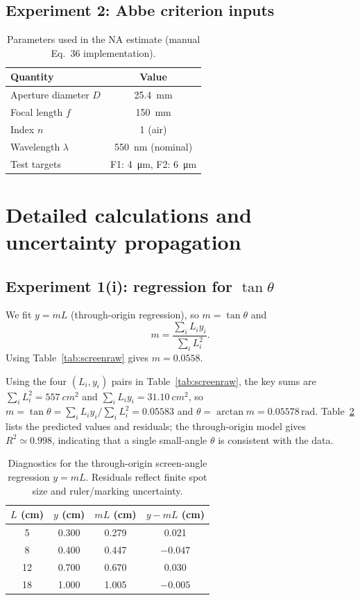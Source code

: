 \documentclass[10pt,twocolumn]{article}
\begin{document}
\subsection{Experiment 2: Abbe criterion inputs}
\begin{table}[H]
\centering
\caption{Parameters used in the NA estimate (manual Eq.~36 implementation).}
\label{tab:abbeinputs}
\begin{tabular}{@{}lc@{}}
\toprule
Quantity & Value \\ \midrule
Aperture diameter $D$ & \SI{25.4}{\milli\meter} \\
Focal length $f$ & \SI{150}{\milli\meter} \\
Index $n$ & 1 (air) \\
Wavelength $\lambda$ & \SI{550}{\nano\meter} (nominal) \\
Test targets & F1: \SI{4}{\micro\meter}, F2: \SI{6}{\micro\meter} \\ \bottomrule
\end{tabular}
\end{table}

\section{Detailed calculations and uncertainty propagation}
\label{app:calc}
\subsection{Experiment 1(i): regression for $\tan\theta$}
We fit $y=mL$ (through-origin regression), so $m=\tan\theta$ and
\begin{equation}
 m = \frac{\sum_i L_i y_i}{\sum_i L_i^2}.
\end{equation}
Using Table~\ref{tab:screenraw} gives $m=0.0558$.

Using the four $(L_i,y_i)$ pairs in Table~\ref{tab:screenraw}, the key sums are
$\sum_i L_i^2=\SI{557}{cm^2}$ and $\sum_i L_i y_i=\SI{31.10}{cm^2}$, so
$m=\tan\theta=\sum_i L_i y_i/\sum_i L_i^2=0.05583$ and $\theta=\arctan m=0.05578\,\mathrm{rad}$.
Table~\ref{tab:screenres} lists the predicted values and residuals; the through-origin model gives
$R^2\simeq0.998$, indicating that a single small-angle $\theta$ is consistent with the data.

\begin{table}[H]
\centering
\caption{Diagnostics for the through-origin screen-angle regression $y=mL$. Residuals reflect finite spot size and ruler/marking uncertainty.}
\label{tab:screenres}
\begin{tabular}{@{}cccc@{}}
\toprule
$L$ (cm) & $y$ (cm) & $mL$ (cm) & $y-mL$ (cm) \\ \midrule
5  & 0.300 & 0.279 & 0.021 \\
8  & 0.400 & 0.447 & $-0.047$ \\
12 & 0.700 & 0.670 & 0.030 \\
18 & 1.000 & 1.005 & $-0.005$ \\ \bottomrule
\end{tabular}
\end{table}
\end{document}
